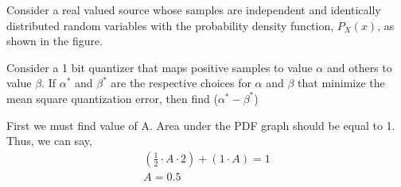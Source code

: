 \documentclass[]{article}
\begin{document}
\providecommand{\qfunc}[1]{\ensuremath{Q\left(#1\right)}}
\providecommand{\gauss}[2]{\mathcal{N}\ensuremath{\left(#1,#2\right)}}
\providecommand{\diff}[2]{\ensuremath{\frac{d{#1}}{d{#2}}}}
\providecommand{\myceil}[1]{\left \lceil #1 \right \rceil }
\newcommand\figref{Fig.~\ref}
\newcommand\tabref{Table~\ref}
\newcommand{\sinc}{\,\text{sinc}\,}
\newcommand{\rect}{\,\text{rect}\,}

\let\vec\mathbf

Consider a real valued source whose samples are independent and identically
distributed random variables with the probability density function, $P_X(x)$, as shown in
the figure.

\begin{center}
\end{center}

Consider a 1 bit quantizer that maps positive samples to value $\alpha$ and others to value
$\beta$. If $\alpha ^*$ and $\beta ^*$ are the respective choices for $\alpha$ and $\beta$ that minimize the mean square
quantization error, then find ($\alpha ^* - \beta ^*$)

\solution
First we must find value of A. Area under the PDF graph should be equal to 1. Thus, we can say,
\begin{align}
    (\frac{1}{2}\cdot A\cdot 2) + (1\cdot A) = 1 \\
    A = 0.5
\end{align}
\end{document}
